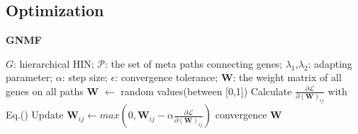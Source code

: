 \documentclass{bioinfo}
\begin{document}
\begin{methods}
\subsection{Optimization}
\begin{algorithm}[t]
\caption{\textbf{GNMF}}\label{alg:GNMF}
\renewcommand{\algorithmicrequire}{\textbf{Input:}}
\renewcommand{\algorithmicensure}{\textbf{Output:}}
\label{alg:pf}
\begin{algorithmic}[1]
\REQUIRE
    \STATE $G$: hierarchical HIN;
    \STATE $\mathcal{P}$: the set of meta paths connecting genes;
    \STATE $\lambda_1$,$\lambda_2$: adapting parameter;
    \STATE $\alpha$: step size;
    \STATE $\epsilon$: convergence tolerance;
\ENSURE ${\bm{W}}$: the weight matrix of all genes on all paths
\ENDFOR
\STATE ${\bm{W}}$ $\leftarrow$ random values(between [0,1])
\REPEAT
    \STATE Calculate $\frac{\partial{\mathcal{L}}}{\partial{(\bm{W})_{ij}}}$ with Eq.()
    \STATE Update $\bm{W}_{ij}\leftarrow max(0,\bm{W}_{ij}-\alpha \frac{\partial{\mathcal{L}}}{\partial{(\bm{W})_{ij}}})$
\UNTIL convergence
\RETURN ${\bm{W}}$
\end{algorithmic}
\end{algorithm}
\end{methods}
\end{document}
